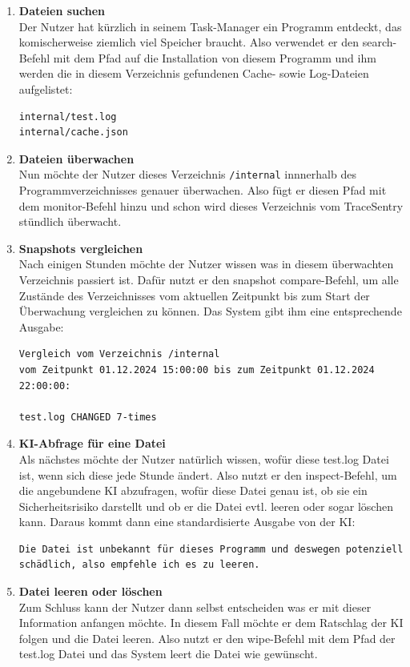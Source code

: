 \documentclass[a4paper,12pt]{report}
\begin{document}
    \begin{enumerate}
        \item \textbf{Dateien suchen}\\
        Der Nutzer hat kürzlich in seinem Task-Manager ein Programm entdeckt, das komischerweise
        ziemlich viel Speicher braucht.
        Also verwendet er den search-Befehl mit dem Pfad auf die Installation von diesem Programm
        und ihm werden die in diesem Verzeichnis gefundenen Cache- sowie Log-Dateien aufgelistet:
        \begin{verbatim}
internal/test.log
internal/cache.json
        \end{verbatim}

        \item \textbf{Dateien überwachen}\\
        Nun möchte der Nutzer dieses Verzeichnis \texttt{/internal} innnerhalb des Programmverzeichnisses genauer überwachen.
        Also fügt er diesen Pfad mit dem monitor-Befehl hinzu und schon wird dieses Verzeichnis vom TraceSentry stündlich überwacht.

        \item \textbf{Snapshots vergleichen}\\
        Nach einigen Stunden möchte der Nutzer wissen was in diesem überwachten Verzeichnis passiert ist.
        Dafür nutzt er den snapshot compare-Befehl, um alle Zustände des Verzeichnisses vom aktuellen Zeitpunkt bis zum Start der Überwachung vergleichen zu können.
        Das System gibt ihm eine entsprechende Ausgabe:
        \begin{verbatim}
Vergleich vom Verzeichnis /internal
vom Zeitpunkt 01.12.2024 15:00:00 bis zum Zeitpunkt 01.12.2024 22:00:00:

test.log CHANGED 7-times
        \end{verbatim}

        \item \textbf{KI-Abfrage für eine Datei}\\
        Als nächstes möchte der Nutzer natürlich wissen, wofür diese test.log Datei ist, wenn sich diese jede Stunde ändert.
        Also nutzt er den inspect-Befehl, um die angebundene KI abzufragen, wofür diese Datei genau ist, ob sie ein Sicherheitsrisiko darstellt
        und ob er die Datei evtl. leeren oder sogar löschen kann.
        Daraus kommt dann eine standardisierte Ausgabe von der KI:
        \begin{verbatim}
Die Datei ist unbekannt für dieses Programm und deswegen potenziell
schädlich, also empfehle ich es zu leeren.
        \end{verbatim}

        \item \textbf{Datei leeren oder löschen}\\
        Zum Schluss kann der Nutzer dann selbst entscheiden was er mit dieser Information anfangen möchte.
        In diesem Fall möchte er dem Ratschlag der KI folgen und die Datei leeren.
        Also nutzt er den wipe-Befehl mit dem Pfad der test.log Datei und das System leert die Datei wie gewünscht.
    \end{enumerate}
\end{document}
